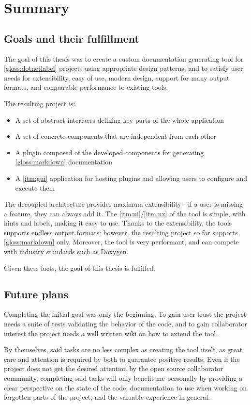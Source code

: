 \chapter*{Summary}

\section*{Goals and their fulfillment}

The goal of this thesis was to create a custom documentation generating tool for \ref{gloss:dotnetlabel} projects using appropriate design patterns, and to satisfy user needs for extensibility, easy of use, modern design, support for many output formats, and comparable performance to existing tools.

The resulting project is:
\begin{itemize}
    \item A set of abstract interfaces defining key parts of the whole application
    \item A set of concrete components that are independent from each other
    \item A plugin composed of the developed components for generating \ref{gloss:markdown} documentation
    \item A \ref{itm:gui} application for hosting plugins and allowing users to configure and execute them
\end{itemize}

The decoupled architecture provides maximum extensibility - if a user is missing a feature, they can always add it. The \ref{itm:ui}/\ref{itm:ux} of the tool is simple, with hints and labels, making it easy to use. Thanks to the extensibility, the tools supports endless output formats; however, the resulting project so far supports \ref{gloss:markdown} only. Moreover, the tool is very performant, and can compete with industry standards such as Doxygen.

Given these facts, the goal of this thesis is fulfilled.

\section*{Future plans}

Completing the initial goal was only the beginning. To gain user trust the project needs a suite of tests validating the behavior of the code, and to gain collaborator interest the project needs a well written wiki on how to extend the tool.

By themselves, said tasks are no less complex as creating the tool itself, as great care and attention is required by both to guarantee positive results. Even if the project does not get the desired attention by the open source collaborator community, completing said tasks will only benefit me personally by providing a clear perspective on the state of the code, documentation to use when working on forgotten parts of the project, and the valuable experience in general.